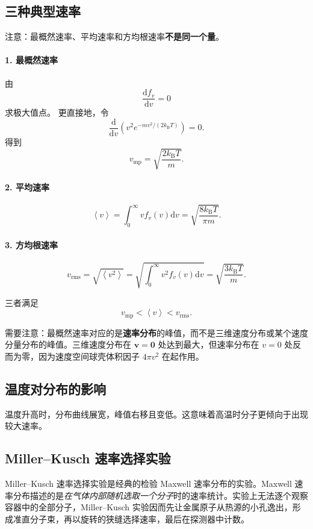 \documentclass[11pt,a4paper,openany]{ctexbook}
\newcommand{\dd}{\mathrm d}
\newcommand{\kb}{k_{\mathrm B}}
\newcommand{\avg}[1]{\left\langle #1\right\rangle}
\newcommand{\vv}{\bm{v}}
\begin{document}
\subsection*{三种典型速率}
注意：最概然速率、平均速率和方均根速率\textbf{不是同一个量}。

\paragraph{1. 最概然速率}
由
\[
\frac{\dd f_v}{\dd v}=0
\]
求极大值点。
更直接地，令
\[
\frac{\dd}{\dd v}\left(v^2e^{-mv^2/(2\kb T)}\right)=0.
\]
得到
\[
\boxed{v_{\mathrm{mp}}=\sqrt{\frac{2\kb T}{m}}}.
\]

\paragraph{2. 平均速率}
\[
\avg v=\int_0^\infty vf_v(v)\dd v
=
\boxed{\sqrt{\frac{8\kb T}{\pi m}}}.
\]

\paragraph{3. 方均根速率}
\[
v_{\mathrm{rms}}=\sqrt{\avg{v^2}}
=
\sqrt{\int_0^\infty v^2f_v(v)\dd v}
=
\boxed{\sqrt{\frac{3\kb T}{m}}}.
\]

三者满足
\[
v_{\mathrm{mp}}<\avg v<v_{\mathrm{rms}}.
\]

\begin{notebox}
需要注意：最概然速率对应的是\textbf{速率分布}的峰值，而不是三维速度分布或某个速度分量分布的峰值。三维速度分布在 $\vv=\bm0$ 处达到最大，但速率分布在 $v=0$ 处反而为零，因为速度空间球壳体积因子 $4\pi v^2$ 在起作用。
\end{notebox}

\subsection*{温度对分布的影响}
温度升高时，分布曲线展宽，峰值右移且变低。这意味着高温时分子更倾向于出现较大速率。



\subsection*{Miller--Kusch 速率选择实验}
Miller--Kusch 速率选择实验是经典的检验 Maxwell 速率分布的实验。Maxwell 速率分布描述的是\emph{在气体内部随机选取一个分子}时的速率统计。实验上无法逐个观察容器中的全部分子，Miller--Kusch 实验因而先让金属原子从热源的小孔逸出，形成准直分子束，再以旋转的狭缝选择速率，最后在探测器中计数。
\end{document}
